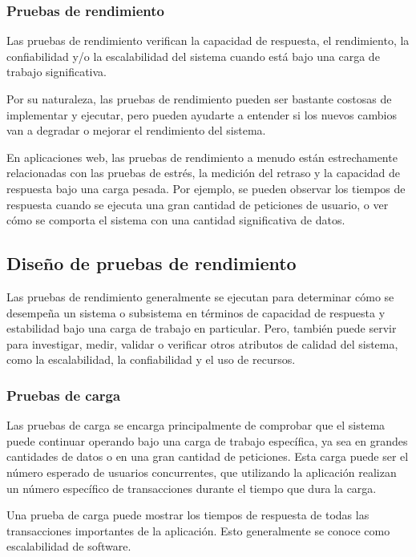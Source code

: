 \subsubsection{Pruebas de rendimiento}

Las pruebas de rendimiento verifican la capacidad de respuesta, el rendimiento, la confiabilidad y/o la escalabilidad del sistema cuando está bajo una carga de trabajo significativa.

Por su naturaleza, las pruebas de rendimiento pueden ser bastante costosas de implementar y ejecutar, pero pueden ayudarte a entender si los nuevos cambios van a degradar o mejorar el rendimiento del sistema.

En aplicaciones web, las pruebas de rendimiento a menudo están estrechamente relacionadas con las pruebas de estrés, la medición del retraso y la capacidad de respuesta bajo una carga pesada. Por ejemplo, se pueden observar los tiempos de respuesta cuando se ejecuta una gran cantidad de peticiones de usuario, o ver cómo se comporta el sistema con una cantidad significativa de datos.

\subsection{Diseño de pruebas de rendimiento}

Las pruebas de rendimiento generalmente se ejecutan para determinar cómo se desempeña un sistema o subsistema en términos de capacidad de respuesta y estabilidad bajo una carga de trabajo en particular. Pero, también puede servir para investigar, medir, validar o verificar otros atributos de calidad del sistema, como la escalabilidad, la confiabilidad y el uso de recursos.

\subsubsection{Pruebas de carga}

Las pruebas de carga se encarga principalmente de comprobar que el sistema puede continuar operando bajo una carga de trabajo específica, ya sea en grandes cantidades de datos o en una gran cantidad de peticiones. Esta carga puede ser el número esperado de usuarios concurrentes, que utilizando la aplicación realizan un número específico de transacciones durante el tiempo que dura la carga.

Una prueba de carga puede mostrar los tiempos de respuesta de todas las transacciones importantes de la aplicación. Esto generalmente se conoce como escalabilidad de software.

